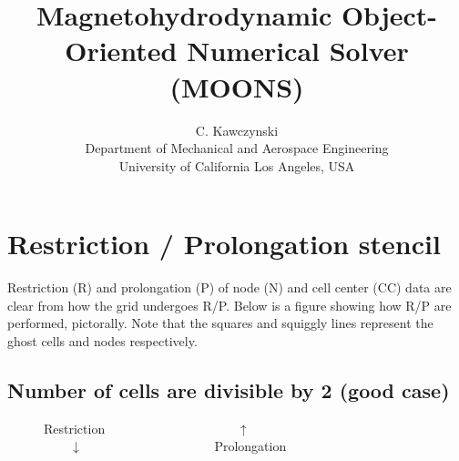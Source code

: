 \documentclass[11pt]{article}
\newcommand{\height}{0.4}
\newcommand{\radius}{0.1}
\newcommand{\dx}{1}
\newcommand{\w}{1}
\newcommand{\qq}{$\qquad \qquad \qquad \qquad \qquad$}
\newcommand{\qe}{$\qquad$}
\begin{document}
\doublespacing
\title{Magnetohydrodynamic Object-Oriented Numerical Solver (MOONS)}
\author{C. Kawczynski \\
Department of Mechanical and Aerospace Engineering \\
University of California Los Angeles, USA\\
}
\maketitle

\section{Restriction / Prolongation stencil}
Restriction (R) and prolongation (P) of node (N) and cell center (CC) data are clear from how the grid undergoes R/P. Below is a figure showing how R/P are performed, pictorally. Note that the squares and squiggly lines represent the ghost cells and nodes respectively.\\

\subsection{Number of cells are divisible by 2 (good case)}

\begin{figure}[h!]
  \begin{center}
    \caption*{Restriction \qq $\uparrow$ \qe \\ \qe $\downarrow$ \qq Prolongation}
  \end{center}
\end{figure}
\end{document}
